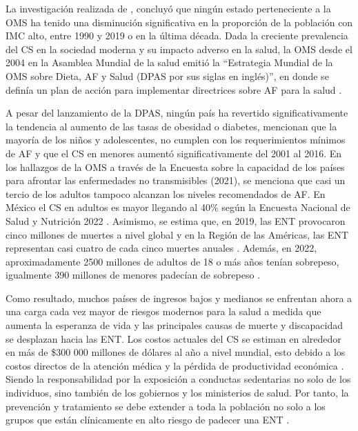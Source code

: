 La investigación realizada de \citet{Murray2020GBD}, concluyó que ningún estado perteneciente a la OMS ha tenido una disminución significativa en la proporción de la población con IMC alto, entre 1990 y 2019 o en la última década. Dada la creciente prevalencia del CS en la sociedad moderna y su impacto adverso en la salud, la OMS desde el 2004 en la Asamblea Mundial de la salud emitió la ``Estrategia Mundial de la OMS sobre Dieta, AF y Salud (DPAS por sus siglas en inglés)'', en donde se definía un plan de acción para implementar directrices sobre AF para la salud \citep{Meusel2006Framework}.

A pesar del lanzamiento de la DPAS, ningún país ha revertido significativamente la tendencia al aumento de las tasas de obesidad o diabetes, \citet{Guthold2020} mencionan que la mayoría de los niños y adolescentes, no cumplen con los requerimientos mínimos de AF y que el CS en menores aumentó significativamente del 2001 al 2016. En los hallazgos de la OMS a través de la Encuesta sobre la capacidad de los países para afrontar las enfermedades no transmisibles (2021), se menciona que casi un tercio de los adultos tampoco alcanzan los niveles recomendados de AF. En México el CS en adultos es mayor llegando al 40\% según la Encuesta Nacional de Salud y Nutrición 2022 \citep{Campos2023ObesityMexico}. Asimismo, se estima que, en 2019, las ENT provocaron cinco millones de muertes a nivel global y en la Región de las Américas, las ENT representan casi cuatro de cada cinco muertes anuales \citep{StrategicPlanPAHO2020}. Además, en 2022, aproximadamente 2500 millones de adultos de 18 o más años tenían sobrepeso, igualmente 390 millones de menores padecían de sobrepeso \citep{WHO2022InformeActividad}.

Como resultado, muchos países de ingresos bajos y medianos se enfrentan ahora a una carga cada vez mayor de riesgos modernos para la salud a medida que aumenta la esperanza de vida y las principales causas de muerte y discapacidad se desplazan hacia las ENT. Los costos actuales del CS se estiman en alrededor en más de \$300 000 millones de dólares al año a nivel mundial, esto debido a los costos directos de la atención médica y la pérdida de productividad económica \citep{Okunogbe2021Economic}. Siendo la responsabilidad por la exposición a conductas sedentarias no solo de los individuos, sino también de los gobiernos y los ministerios de salud. Por tanto, la prevención y tratamiento se debe extender a toda la población no solo a los grupos que están clínicamente en alto riesgo de padecer una ENT \citep{WHO2009GlobalRisks}.

